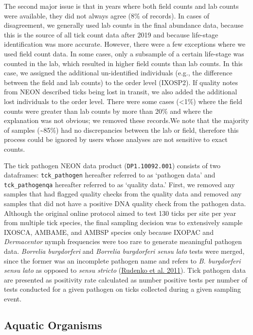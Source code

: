 \documentclass[
  12pt,
]{article}
\begin{document}
The second major issue is that in years where both field counts and lab counts were available, they did not always agree (8\% of records). In cases of disagreement, we generally used lab counts in the final abundance data, because this is the source of all tick count data after 2019 and because life-stage identification was more accurate. However, there were a few exceptions where we used field count data. In some cases, only a subsample of a certain life-stage was counted in the lab, which resulted in higher field counts than lab counts. In this case, we assigned the additional un-identified individuals (e.g., the difference between the field and lab counts) to the order level (IXOSP2). If quality notes from NEON described ticks being lost in transit, we also added the additional lost individuals to the order level. There were some cases (\textless1\%) where the field counts were greater than lab counts by more than 20\% and where the explanation was not obvious; we removed these records.We note that the majority of samples (\textasciitilde85\%) had no discrepancies between the lab or field, therefore this process could be ignored by users whose analyses are not sensitive to exact counts.

The tick pathogen NEON data product (\texttt{DP1.10092.001}) consists of two dataframes: \texttt{tck\_pathogen} hereafter referred to as `pathogen data' and \texttt{tck\_pathogenqa} hereafter referred to as `quality data.' First, we removed any samples that had flagged quality checks from the quality data and removed any samples that did not have a positive DNA quality check from the pathogen data. Although the original online protocol aimed to test 130 ticks per site per year from multiple tick species, the final sampling decision was to extensively sample IXOSCA, AMBAME, and AMBSP species only because IXOPAC and \emph{Dermacentor} nymph frequencies were too rare to generate meaningful pathogen data. \emph{Borrelia burgdorferi} and \emph{Borrelia burgdorferi sensu lato} tests were merged, since the former was an incomplete pathogen name and refers to \emph{B. burgdorferi sensu lato} as opposed to \emph{sensu stricto} (\protect\hyperlink{ref-rudenko2011updates}{Rudenko et al. 2011}). Tick pathogen data are presented as positivity rate calculated as number positive tests per number of tests conducted for a given pathogen on ticks collected during a given sampling event.

\hypertarget{aquatic-organisms}{%
\subsection{Aquatic Organisms}\label{aquatic-organisms}}
\end{document}
